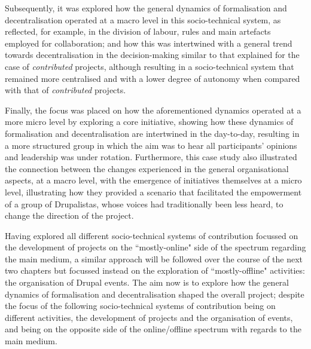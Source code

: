 Subsequently, it was explored how the general dynamics of formalisation and decentralisation operated at a macro level in this socio-technical system, as reflected, for example, in the division of labour, rules and main artefacts employed for collaboration; and how this was intertwined with a general trend towards decentralisation in the decision-making similar to that explained for the case of \textit{contributed} projects, although resulting in a socio-technical system that remained more centralised and with a lower degree of autonomy when compared with that of \textit{contributed} projects.

Finally, the focus was placed on how the aforementioned dynamics operated at a more micro level by exploring a core initiative, showing how these dynamics of formalisation and decentralisation are intertwined in the day-to-day, resulting in a more structured group in which the aim was to hear all participants' opinions and leadership was under rotation. Furthermore, this case study also illustrated the connection between the changes experienced in the general organisational aspects, at a macro level, with the emergence of initiatives themselves at a micro level, illustrating how they provided a scenario that facilitated the empowerment of a group of Drupalistas, whose voices had traditionally been less heard, to change the direction of the project.

Having explored all different socio-technical systems of contribution focussed on the development of projects on the ``mostly-online" side of the spectrum regarding the main medium, a similar approach will be followed over the course of the next two chapters but focussed instead on the exploration of ``mostly-offline" activities: the organisation of Drupal events. The aim now is to explore how the general dynamics of formalisation and decentralisation shaped the overall project; despite the focus of the following socio-technical systems of contribution being on different activities, the development of projects and the organisation of events, and being on the opposite side of the online/offline spectrum with regards to the main medium.